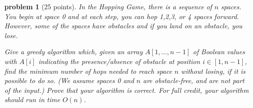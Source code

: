 \documentclass[10pt]{article}
\newtheorem{problem}{\sc\color{cit}problem}
\begin{document}

\newpage
\begin{problem}[25 points]
In the Hopping Game, there is a sequence of $n$ spaces.  You begin at space 0 and at each step, you can hop 1,2,3, or 4 spaces forward. However, some of the spaces have obstacles and if you land on an obstacle, you lose. 

Give a greedy algorithm which, given an array $A[1, \ldots, n-1]$ of Boolean values with $A[i]$ indicating the presence/absence of obstacle at position $i \in [1, n-1]$, find the minimum number of hops needed to reach space $n$ without losing, if it is possible to do so.  (We assume spaces 0 and $n$ are obstacle-free, and are not part of the input.)  Prove that your algorithm is correct. For full credit, your algorithm should run in time $O(n)$.
\end{problem}


\newpage
\medskip{}
\end{document}
